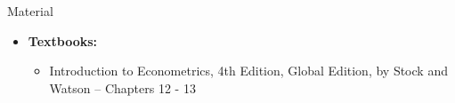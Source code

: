 \documentclass[notes,10pt, aspectratio=169]{beamer}
\begin{document}
\begin{frame}[allowframebreaks]{Material}
\begin{itemize}
    \item[--] \textbf{Textbooks:}
    \begin{itemize}
        \item Introduction to Econometrics, 4th Edition, Global Edition, by Stock and Watson -- Chapters 12 - 13
    \end{itemize}
\end{itemize}
\end{frame}
\end{document}
